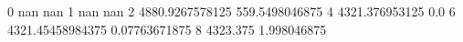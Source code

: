 0 nan nan
1 nan nan
2 4880.9267578125 559.5498046875
4 4321.376953125 0.0
6 4321.45458984375 0.07763671875
8 4323.375 1.998046875

